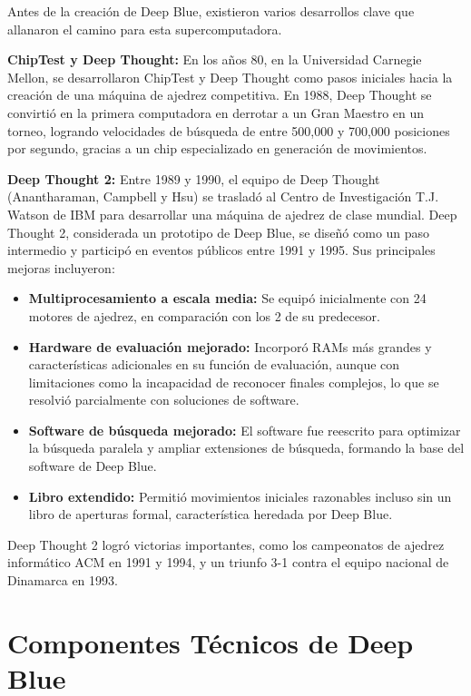 \documentclass[12pt,a4paper]{article}
\begin{document}
Antes de la creación de Deep Blue, existieron varios desarrollos clave que allanaron el camino para esta supercomputadora.

\textbf{ChipTest y Deep Thought:} En los años 80, en la Universidad Carnegie Mellon, se desarrollaron ChipTest y Deep Thought como pasos iniciales hacia la creación de una máquina de ajedrez competitiva. En 1988, Deep Thought se convirtió en la primera computadora en derrotar a un Gran Maestro en un torneo, logrando velocidades de búsqueda de entre 500,000 y 700,000 posiciones por segundo, gracias a un chip especializado en generación de movimientos.

\textbf{Deep Thought 2:} Entre 1989 y 1990, el equipo de Deep Thought (Anantharaman, Campbell y Hsu) se trasladó al Centro de Investigación T.J. Watson de IBM para desarrollar una máquina de ajedrez de clase mundial. Deep Thought 2, considerada un prototipo de Deep Blue, se diseñó como un paso intermedio y participó en eventos públicos entre 1991 y 1995. Sus principales mejoras incluyeron:  
\begin{itemize}
    \item \textbf{Multiprocesamiento a escala media:} Se equipó inicialmente con 24 motores de ajedrez, en comparación con los 2 de su predecesor.
    \item \textbf{Hardware de evaluación mejorado:} Incorporó RAMs más grandes y características adicionales en su función de evaluación, aunque con limitaciones como la incapacidad de reconocer finales complejos, lo que se resolvió parcialmente con soluciones de software.
    \item \textbf{Software de búsqueda mejorado:} El software fue reescrito para optimizar la búsqueda paralela y ampliar extensiones de búsqueda, formando la base del software de Deep Blue.
    \item \textbf{Libro extendido:} Permitió movimientos iniciales razonables incluso sin un libro de aperturas formal, característica heredada por Deep Blue.
\end{itemize}

Deep Thought 2 logró victorias importantes, como los campeonatos de ajedrez informático ACM en 1991 y 1994, y un triunfo 3-1 contra el equipo nacional de Dinamarca en 1993.

\newpage

\section{Componentes Técnicos de Deep Blue}
\end{document}
